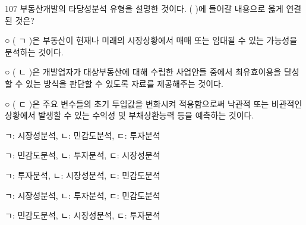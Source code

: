 \begin{question}{107}
부동산개발의 타당성분석 유형을 설명한 것이다. ( )에 들어갈 내용으로 옳게 연결된 것은?
\begin{framedtext}
○ ( ㄱ )은 부동산이 현재나 미래의 시장상황에서 매매 또는 임대될 수 있는 가능성을 분석하는 것이다. \par
○ ( ㄴ )은 개발업자가 대상부동산에 대해 수립한 사업안들 중에서 최유효이용을 달성할 수 있는 방식을 판단할 수 있도록 자료를 제공해주는 것이다. \par
○ ( ㄷ )은 주요 변수들의 초기 투입값을 변화시켜 적용함으로써 낙관적 또는 비관적인 상황에서 발생할 수 있는 수익성 및 부채상환능력 등을 예측하는 것이다.
\end{framedtext}
\begin{choices}
  \item ㄱ: 시장성분석, ㄴ: 민감도분석, ㄷ: 투자분석
  \item ㄱ: 민감도분석, ㄴ: 투자분석, ㄷ: 시장성분석
  \item ㄱ: 투자분석, ㄴ: 시장성분석, ㄷ: 민감도분석
  \item ㄱ: 시장성분석, ㄴ: 투자분석, ㄷ: 민감도분석
  \item ㄱ: 민감도분석, ㄴ: 시장성분석, ㄷ: 투자분석
\end{choices}
\end{question}
